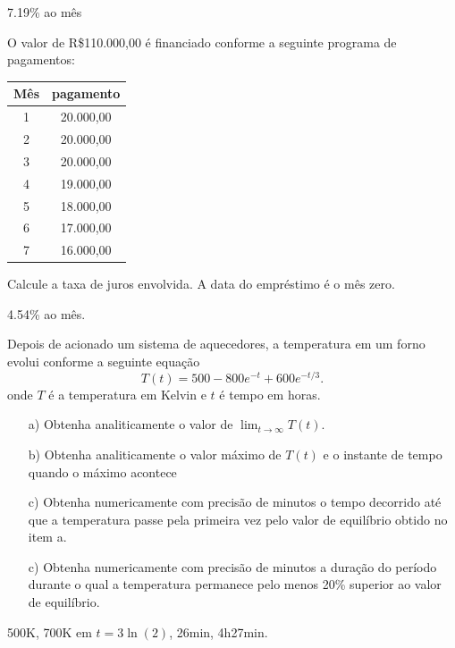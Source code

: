 \begin{Answer}
7.19\% ao mês
\end{Answer}

\begin{Exercise}[title= Matemática financeira] O valor de R\$110.000,00 é financiado conforme a seguinte programa de pagamentos:

\begin{tabular}{|c|c|}
\hline
Mês & pagamento\\
\hline
1&20.000,00\\
2&20.000,00\\
3&20.000,00\\
4&19.000,00\\
5&18.000,00\\
6&17.000,00\\
7&16.000,00\\
\hline	
\end{tabular}

Calcule a taxa de juros envolvida. A data do empréstimo é o mês zero.
 \end{Exercise}

\begin{Answer}
4.54\% ao mês.
\end{Answer}


\begin{Exercise}[title=Controle de sistemas]  Depois de acionado um sistema de aquecedores, a temperatura em um forno  evolui conforme a seguinte equação
$$T(t)=500-800e^{-t}+600e^ {-t/3}.$$
onde $T$ é a temperatura em Kelvin e $t$ é tempo em horas.
\begin{itemize}
\item[a)] Obtenha analiticamente o valor de $\lim_{t\to\infty}T(t)$.
\item[b)] Obtenha analiticamente o valor máximo de $T(t)$ e o instante de tempo quando o máximo acontece
\item[c)] Obtenha numericamente com precisão de minutos o tempo decorrido até que a temperatura passe pela primeira vez pelo valor de equilíbrio obtido no item a.
\item[c)] Obtenha numericamente com precisão de minutos a duração do período durante o qual a temperatura permanece pelo menos 20\% superior ao valor de equilíbrio.
\end{itemize}
\end{Exercise}

\begin{Answer}
500K, 700K em $t=3\ln(2)$, 26min, 4h27min.
\end{Answer}

